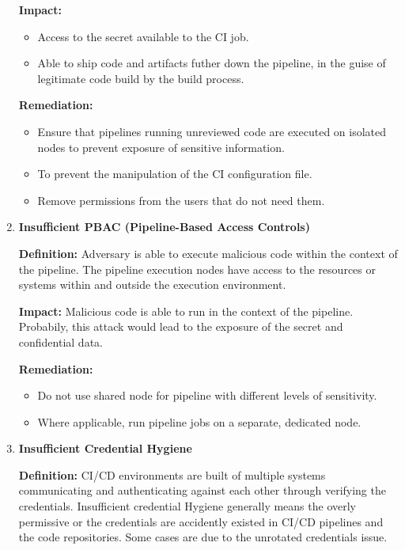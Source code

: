 \begin{enumerate}[label=(\arabic*)]
    \textbf{Impact: }
        \begin{itemize}
            \item Access to the secret available to the CI job.
            \item Able to ship code and artifacts futher down the pipeline, in the guise of legitimate 
            code build by the build process.
        \end{itemize}

    \textbf{Remediation:}
        \begin{itemize}
            \item Ensure that pipelines running unreviewed code are executed on isolated nodes to prevent
            exposure of sensitive information.
            \item To prevent the manipulation of the CI configuration file.
            \item Remove permissions from the users that do not need them.
        \end{itemize}
    \item \textbf{Insufficient PBAC (Pipeline-Based Access Controls)}

    \textbf{Definition: }
        Adversary is able to execute malicious code within the context of the pipeline.
        The pipeline execution nodes have access to the resources or systems within and outside the 
        execution environment.

    \textbf{Impact: }
        Malicious code is able to run in the context of the pipeline. Probabily, this attack would lead to 
        the exposure of the secret and confidential data.
        
    \textbf{Remediation:}
        \begin{itemize}
            \item Do not use shared node for pipeline with different levels of sensitivity.
            \item Where applicable, run pipeline jobs on a separate, dedicated node.
        \end{itemize}
    \item \textbf{Insufficient Credential Hygiene}

    \textbf{Definition: }
        CI/CD environments are built of multiple systems communicating and authenticating against each other
        through verifying the credentials. Insufficient credential Hygiene generally means the overly permissive
        or the credentials are accidently existed in CI/CD pipelines and the code repositories. Some cases are
        due to the unrotated credentials issue.  


\end{enumerate}
